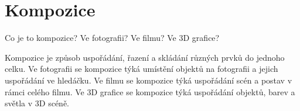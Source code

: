 \section{Kompozice}
Co je to kompozice? Ve fotografii? Ve filmu? Ve 3D grafice?

Kompozice je způsob uspořádání, řazení a skládání různých prvků do jednoho celku. Ve fotografii
se kompozice týká umístění objektů na fotografii a jejich uspořádání ve hledáčku. Ve filmu se
kompozice týká uspořádání scén a postav v rámci celého filmu. Ve 3D grafice se kompozice týká
uspořádání objektů, barev a světla v 3D scéně.